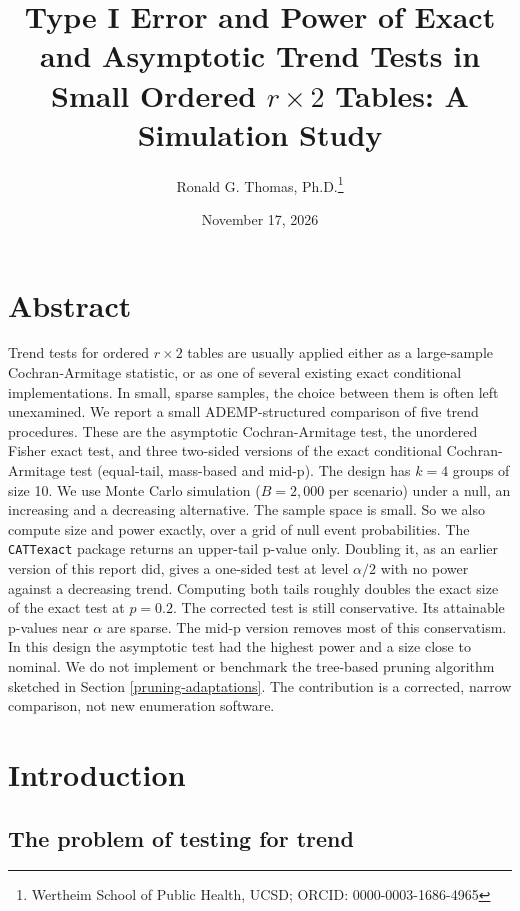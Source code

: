 \documentclass[
  11pt,
]{article}
\title{Type I Error and Power of Exact and Asymptotic Trend Tests in Small Ordered \(r \times 2\) Tables: A Simulation Study}
\author{Ronald G. Thomas, Ph.D.\thanks{Wertheim School of Public Health, UCSD; ORCID: 0000-0003-1686-4965}}
\date{November 17, 2026}
\begin{document}
\maketitle

{
\setcounter{tocdepth}{2}
\tableofcontents
}
\section*{Abstract}\label{abstract}

Trend tests for ordered \(r \times 2\) tables are usually
applied either as a large-sample Cochran-Armitage
statistic, or as one of several existing exact conditional
implementations. In small, sparse samples, the choice
between them is often left unexamined. We report a small
ADEMP-structured comparison of five trend procedures. These
are the asymptotic Cochran-Armitage test, the unordered
Fisher exact test, and three two-sided versions of the
exact conditional Cochran-Armitage test (equal-tail,
mass-based and mid-p).
The design has \(k = 4\) groups of size 10. We use Monte
Carlo simulation (\(B = 2{,}000\) per scenario) under a
null, an increasing and a decreasing alternative. The
sample space is small. So we also compute size and power
exactly, over a grid of null event probabilities. The
\texttt{CATTexact} package returns an upper-tail p-value only.
Doubling it, as an earlier version of this report did,
gives a one-sided test at level \(\alpha/2\) with no power
against a decreasing trend. Computing both tails roughly
doubles the exact size of the exact test at \(p = 0.2\).
The corrected test is still conservative. Its attainable
p-values near \(\alpha\) are sparse. The mid-p
version removes most of this conservatism. In this design
the asymptotic test had the highest power and a size
close to nominal. We do not implement or benchmark the
tree-based pruning algorithm sketched in Section
\ref{pruning-adaptations}. The contribution is a
corrected, narrow comparison, not new enumeration
software.

\section{Introduction}\label{introduction}

\subsection{The problem of testing for trend}\label{the-problem-of-testing-for-trend}
\end{document}
